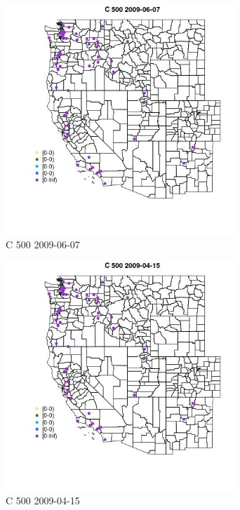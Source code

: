 \begin{figure} 
\centering  
\includegraphics[width=0.77\textwidth]{Code_Outputs/Report_ML_input_PM25_Step4_part_e_de_duplicated_aves_MapObsC_5002009-06-07.jpg} 
\caption{\label{fig:Report_ML_input_PM25_Step4_part_e_de_duplicated_avesMapObsC_5002009-06-07}C 500 2009-06-07} 
\end{figure} 
 

\begin{figure} 
\centering  
\includegraphics[width=0.77\textwidth]{Code_Outputs/Report_ML_input_PM25_Step4_part_e_de_duplicated_aves_MapObsC_5002009-04-15.jpg} 
\caption{\label{fig:Report_ML_input_PM25_Step4_part_e_de_duplicated_avesMapObsC_5002009-04-15}C 500 2009-04-15} 
\end{figure} 
 

